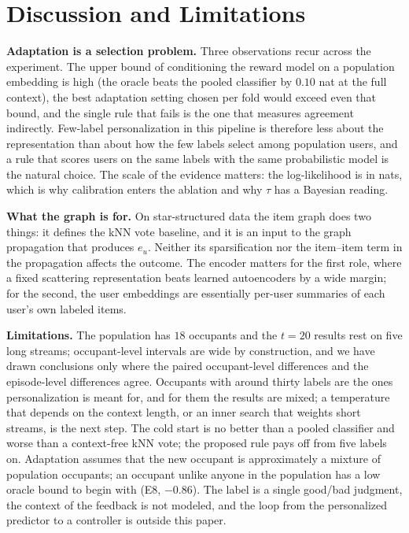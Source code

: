 \documentclass[conference]{IEEEtran}
\begin{document}
\section{Discussion and Limitations}
\label{sec:discussion}

\textbf{Adaptation is a selection problem.} Three observations recur across the experiment. The upper bound of conditioning the reward model on a population embedding is high (the oracle beats the pooled classifier by $0.10$ nat at the full context), the best adaptation setting chosen per fold would exceed even that bound, and the single rule that fails is the one that measures agreement indirectly. Few-label personalization in this pipeline is therefore less about the representation than about how the few labels select among population users, and a rule that scores users on the same labels with the same probabilistic model is the natural choice. The scale of the evidence matters: the log-likelihood is in nats, which is why calibration enters the ablation and why $\tau$ has a Bayesian reading.

\textbf{What the graph is for.} On star-structured data the item graph does two things: it defines the kNN vote baseline, and it is an input to the graph propagation that produces $e_u$. Neither its sparsification nor the item--item term in the propagation affects the outcome. The encoder matters for the first role, where a fixed scattering representation beats learned autoencoders by a wide margin; for the second, the user embeddings are essentially per-user summaries of each user's own labeled items.

\textbf{Limitations.} The population has $18$ occupants and the $t=20$ results rest on five long streams; occupant-level intervals are wide by construction, and we have drawn conclusions only where the paired occupant-level differences and the episode-level differences agree. Occupants with around thirty labels are the ones personalization is meant for, and for them the results are mixed; a temperature that depends on the context length, or an inner search that weights short streams, is the next step. The cold start is no better than a pooled classifier and worse than a context-free kNN vote; the proposed rule pays off from five labels on. Adaptation assumes that the new occupant is approximately a mixture of population occupants; an occupant unlike anyone in the population has a low oracle bound to begin with (E8, $-0.86$). The label is a single good/bad judgment, the context of the feedback is not modeled, and the loop from the personalized predictor to a controller is outside this paper.
\end{document}
